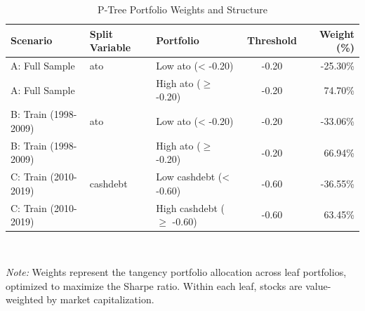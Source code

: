 \begin{table}[!ht]
\centering
\caption{P-Tree Portfolio Weights and Structure}
\label{tab:leaf_weights}
\begin{tabular}{l l l c r}
\hline
Scenario & Split Variable & Portfolio & Threshold & Weight (\%) \\
\hline
A: Full Sample & ato & Low ato (< -0.20) & -0.20 & -25.30\% \\
A: Full Sample &  & High ato ($\geq$ -0.20) & -0.20 & 74.70\% \\
\hline
B: Train (1998-2009) & ato & Low ato (< -0.20) & -0.20 & -33.06\% \\
B: Train (1998-2009) &  & High ato ($\geq$ -0.20) & -0.20 & 66.94\% \\
\hline
C: Train (2010-2019) & cashdebt & Low cashdebt (< -0.60) & -0.60 & -36.55\% \\
C: Train (2010-2019) &  & High cashdebt ($\geq$ -0.60) & -0.60 & 63.45\% \\
\hline
\end{tabular}
\\[0.5em]
\begin{minipage}{0.95\textwidth}
\footnotesize
\textit{Note:} Weights represent the tangency portfolio allocation across leaf portfolios, optimized to maximize the Sharpe ratio. Within each leaf, stocks are value-weighted by market capitalization.
\end{minipage}
\end{table}

